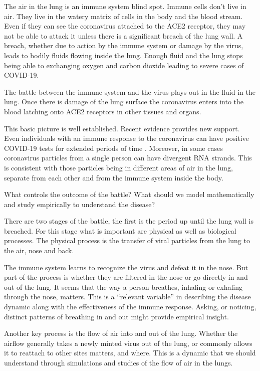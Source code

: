 \documentclass[onecolumn,journal]{IEEEtran}
\begin{document}
\begin{multicols}{2}
The air in the lung is an immune system blind spot. Immune cells don't live in air. They live in the watery matrix of cells in the body and the blood stream. Even if they can see the coronavirus attached to the ACE2 receptor, they may not be able to attack it unless there is a significant breach of the lung wall. A breach, whether due to action by the immune system or damage by the virus, leads to bodily fluids flowing inside the lung. Enough fluid and the lung stops being able to exchanging oxygen and carbon dioxide leading to severe cases of COVID-19.

The battle between the immune system and the virus plays out in the fluid in the lung. Once there is damage of the lung surface the coronavirus enters into the blood latching onto ACE2 receptors in other tissues and organs.

This basic picture is well established. Recent evidence provides new support. Even individuals with an immune response to the coronavirus can have positive COVID-19 tests for extended periods of time \cite{antibody}. Moreover, in some cases coronavirus particles from a single person can have divergent RNA strands. This is consistent with those particles being in different areas of air in the lung, separate from each other and from the immune system inside the body.

What controls the outcome of the battle? What should we model mathematically and study empirically to understand the disease? 

There are two stages of the battle, the first is the period up until the lung wall is breached. For this stage what is important are physical as well as biological processes. The physical process is the transfer of viral particles from the lung to the air, nose and back. 

The immune system learns to recognize the virus and defeat it in the nose. But part of the process is whether they are filtered in the nose or go directly in and out of the lung. It seems that the way a person breathes, inhaling or exhaling through the nose, matters. This is a ``relevant variable'' in describing the disease dynamic along with the effectiveness of the immune response. Asking, or noticing, distinct patterns of breathing in and out might provide empirical insight. 

Another key process is the flow of air into and out of the lung. Whether the airflow generally takes a newly minted virus out of the lung, or commonly allows it to reattach to other sites matters, and where. This is a dynamic that we should understand through simulations and studies of the flow of air in the lungs.


\end{multicols}
\end{document}
